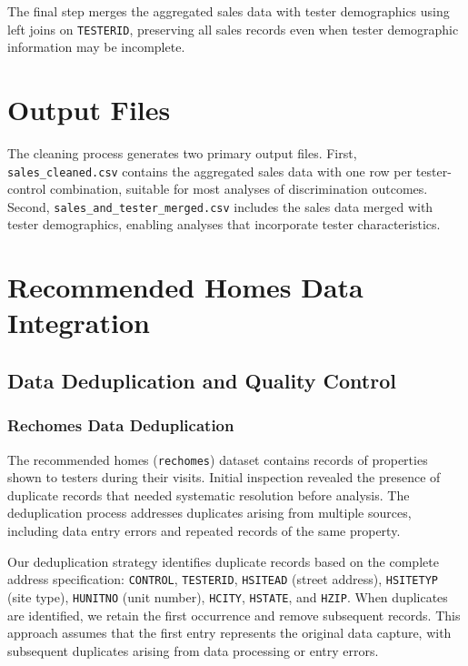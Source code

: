 \documentclass{article}
\begin{document}
The final step merges the aggregated sales data with tester demographics using left joins on \texttt{TESTERID}, preserving all sales records even when tester demographic information may be incomplete.

\section{Output Files}

The cleaning process generates two primary output files. First, \texttt{sales\_cleaned.csv} contains the aggregated sales data with one row per tester-control combination, suitable for most analyses of discrimination outcomes. Second, \texttt{sales\_and\_tester\_merged.csv} includes the sales data merged with tester demographics, enabling analyses that incorporate tester characteristics.

\section{Recommended Homes Data Integration}

\subsection{Data Deduplication and Quality Control}

\subsubsection{Rechomes Data Deduplication}

The recommended homes (\texttt{rechomes}) dataset contains records of properties shown to testers during their visits. Initial inspection revealed the presence of duplicate records that needed systematic resolution before analysis. The deduplication process addresses duplicates arising from multiple sources, including data entry errors and repeated records of the same property.

Our deduplication strategy identifies duplicate records based on the complete address specification: \texttt{CONTROL}, \texttt{TESTERID}, \texttt{HSITEAD} (street address), \texttt{HSITETYP} (site type), \texttt{HUNITNO} (unit number), \texttt{HCITY}, \texttt{HSTATE}, and \texttt{HZIP}. When duplicates are identified, we retain the first occurrence and remove subsequent records. This approach assumes that the first entry represents the original data capture, with subsequent duplicates arising from data processing or entry errors.
\end{document}
